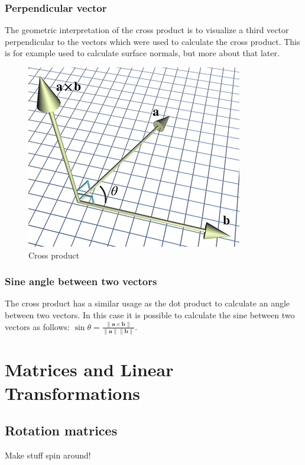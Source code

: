 \documentclass[11pt]{article}
\begin{document}
\subsubsection{Perpendicular vector}

The geometric interpretation of the cross product is to visualize a third vector perpendicular to the vectors which were used to calculate the cross product. This is for example used to calculate surface normals, but more about that later.

\begin{figure}[H]
\centering
    \includegraphics{02_cross_product}
\caption{Cross product}
\label{fig:cross-product}
\end{figure}

\subsubsection{Sine angle between two vectors}

The cross product has a similar usage as the dot product to calculate an angle between two vectors. In this case it is possible to calculate the sine between two vectors as follows: $\sin\theta=\frac{\|\textbf{a}\times\textbf{b}\|}{\|\textbf{a}\|\|\textbf{b}\|}$.

\newpage	
\section{Matrices and Linear Transformations}

\subsection{Rotation matrices}

Make stuff spin around!
\end{document}
